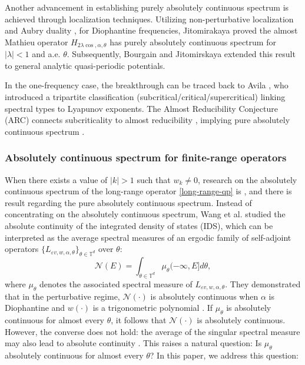\documentclass[11pt]{amsart}
\theoremstyle{remark}
\theoremstyle{definition}
\begin{document}
Another advancement in establishing purely absolutely continuous spectrum is achieved through localization techniques. Utilizing non-perturbative localization and Aubry duality \cite{DF2,GJLS}, for Diophantine frequencies, Jitomirakaya  \cite{J1999} proved the almost Mathieu operator $H_{2\lambda \cos,\alpha,\theta}$ has purely absolutely continuous spectrum for $|\lambda|<1$ and a.e. $\theta$. Subsequently, Bourgain and Jitomirskaya \cite{BJ} extended this result to general analytic quasi-periodic potentials.



 In the one-frequency case, the breakthrough can be traced back to Avila \cite{avila}, who introduced a tripartite classification (subcritical/critical/supercritical) linking spectral types to Lyapunov exponents. The Almost Reducibility Conjecture (ARC) connects subcriticality to almost reducibility \cite{avila2010almost,avila-kam}, implying pure absolutely continuous spectrum \cite{arcl,Avila: ac}.
 

 \subsubsection{Absolutely continuous spectrum for finite-range operators}

When there exists a value of $ |k| > 1 $ such that $ w_k \neq 0 $, research on the absolutely continuous spectrum of the long-range operator \eqref{long-range-qp} is , and there is  result regarding the pure absolutely continuous spectrum.
 Instead of concentrating on the  absolutely continuous spectrum, Wang et al. \cite{WXYZ} studied the absolute continuity of the integrated density of states (IDS), which can be interpreted as the average spectral measures of an ergodic family of self-adjoint operators $ \{ L_{\varepsilon v, w, \alpha, \theta} \}_{\theta \in \mathbb{T}^d} $ over $ \theta $:
\begin{equation}\label{sids}
    \mathcal{N}(E) = \int_{\theta \in \mathbb{T}^d} \mu_\theta(-\infty, E] d\theta,
\end{equation}
where $ \mu_\theta $ denotes the associated spectral measure of $ L_{\varepsilon v, w, \alpha, \theta} $. They demonstrated that in the perturbative regime, $ \mathcal{N}(\cdot) $ is absolutely continuous when $ \alpha $ is Diophantine and $ w(\cdot) $ is a trigonometric polynomial \cite{WXYZ}. If $ \mu_\theta $ is absolutely continuous for almost every $ \theta $, it follows that $ \mathcal{N}(\cdot) $ is absolutely continuous. However, the converse does not hold: the average of the singular spectral measure may also lead to absolute continuity \cite{AD}. This raises a natural question: Is $ \mu_\theta $ absolutely continuous for almost every $ \theta $? In this paper, we address this question:
\end{document}
